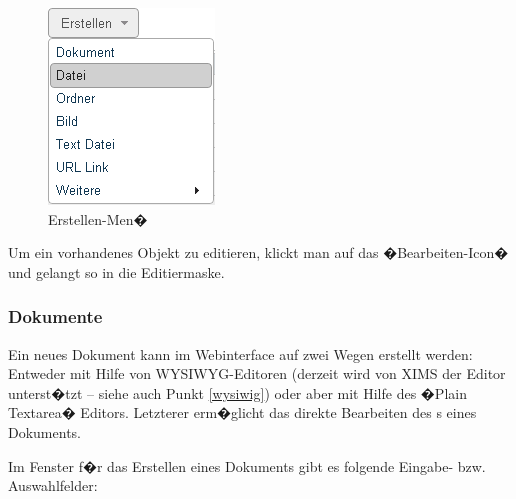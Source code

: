 \begin{figure}[!ht]
  \centering
  \includegraphics[scale=0.8]{./images/create-menu.png}
  \caption{Erstellen-Men�}
  \label{fig:erstellenmenu2}
\end{figure}

Um ein vorhandenes Objekt zu editieren, klickt man auf das �Bearbeiten-Icon� und
gelangt so in die Editiermaske.

\subsubsection{Dokumente}
\label{dokumente}

Ein neues Dokument kann im Webinterface auf zwei Wegen erstellt
werden: Entweder mit Hilfe von WYSIWYG-Editoren (derzeit wird von XIMS der 
Editor unterst�tzt -- siehe auch Punkt \ref{wysiwig})
oder aber mit Hilfe des �Plain Textarea� Editors. Letzterer erm�glicht
das direkte Bearbeiten des s eines Dokuments. 

Im Fenster f�r das Erstellen eines Dokuments gibt es folgende Eingabe-
bzw. Auswahlfelder:

